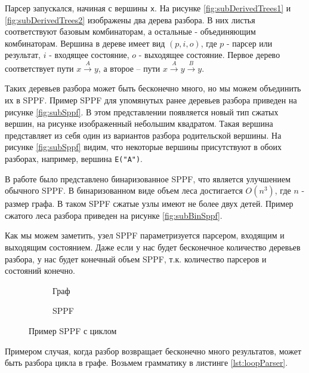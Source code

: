 Парсер запускался, начиная с вершины \texttt{x}. На рисунке \ref{fig:subDerivedTrees1} и \ref{fig:subDerivedTrees2} изображены два дерева разбора. В них листья соответствуют базовым комбинаторам, а остальные - объединяющим комбинаторам. Вершина в дереве имеет вид $(p, i, o)$, где $p$ - парсер или результат, $i$ - входящее состояние, $o$ - выходящее состояние. Первое дерево соответствует пути $x \xrightarrow{A} y$, а второе -- пути $x \xrightarrow{A} y \xrightarrow{B} y$.

Таких деревьев разбора может быть бесконечно много, но мы можем объединить их в SPPF. Пример SPPF для упомянутых ранее деревьев разбора приведен на рисунке \ref{fig:subSppf}. В этом представлении появляется новый тип сжатых вершин, на рисунке изображенный небольшим квадратом. Такая вершина представляет из себя один из вариантов разбора родительской вершины. На рисунке \ref{fig:subSppf} видим, что некоторые вершины присутствуют в обоих разборах, например, вершина \texttt{E("A")}.

В работе \cite{BinSppf} было представлено бинаризованное SPPF, что является улучшением обычного SPPF. В бинаризованном виде объем леса достигается $O(n^3)$, где $n$ - размер графа. В таком SPPF сжатые узлы имеют не более двух детей. Пример сжатого леса разбора приведен на рисунке \ref{fig:subBinSppf}.

Как мы можем заметить, узел SPPF параметризуется парсером, входящим и выходящим состоянием. Даже если у нас будет бесконечное количество деревьев разбора, у нас будет конечный объем SPPF, т.к. количество парсеров и состояний конечно.

\begin{figure}[htp]
    \centering
    \begin{subfigure}[b]{0.3\textwidth}
        \centering
        
        \caption{Граф}
        \label{fig:subLoopGr}
    \end{subfigure}
    \hfill
    \begin{subfigure}[b]{0.5\textwidth}
        \centering
        
        \caption{SPPF}
        \label{fig:subLoopSppf}
    \end{subfigure}

    \caption{Пример SPPF с циклом}
    \label{fig:sppf}
\end{figure}

Примером случая, когда разбор возвращает бесконечно много результатов, может быть разбора цикла в графе. Возьмем грамматику в листинге \ref{lst:loopParser}.

